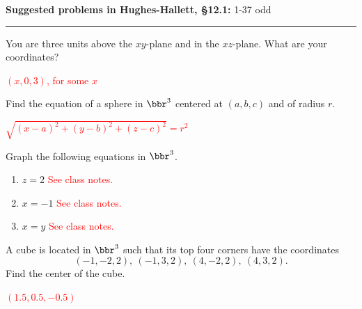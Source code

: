 \documentclass[12pt,reqno]{amsart}
\begin{document}
\textbf{Suggested problems in Hughes-Hallett, \S12.1:} 1-37 odd

\bigskip
\hrule

\bigskip

\prob You are three units above the $xy$-plane and in the $xz$-plane. What are your coordinates?

\bigskip
\textcolor{red}{$(x,0,3)$, for some $x$}
\bigskip

\prob Find the equation of a sphere in $\bbr^3$ centered at $(a,b,c)$ and of radius $r$.

\bigskip
\textcolor{red}{$\sqrt{(x-a)^2 + (y-b)^2 + (z-c)^2} = r^2$}
\bigskip

\prob Graph the following equations in $\bbr^3$.

\medskip
\begin{enumerate}
\item $z=2$ \textcolor{red}{See class notes.}
\item $x=-1$ \textcolor{red}{See class notes.}
\item $x=y$ \textcolor{red}{See class notes.}
\end{enumerate}

\bigskip
\prob A cube is located in $\bbr^3$ such that its top four corners have the coordinates
	\[(-1,-2,2), \ (-1,3,2), \ (4,-2,2), \ (4,3,2).
	\]
Find the center of the cube.

\bigskip
\textcolor{red}{$(1.5,0.5,-0.5)$}
\bigskip
\end{document}
